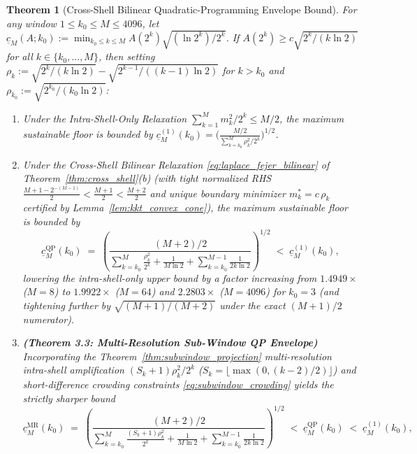 \documentclass[11pt,reqno]{amsart}
\newtheorem{theorem}{Theorem}[section]
\theoremstyle{definition}
\theoremstyle{remark}
\begin{document}
\begin{theorem}[Cross-Shell Bilinear Quadratic-Programming Envelope Bound]\label{thm:qp_envelope}
For any window $1 \le k_0 \le M \le 4096$, let $\underline{c}_M(A; k_0) := \min_{k_0 \le k \le M} A(2^k)\sqrt{(\ln 2^k)/2^k}$. If $A(2^k) \ge c \sqrt{2^k / (k \ln 2)}$ for all $k \in \{k_0, \dots, M\}$, then setting $\rho_k := \sqrt{2^k / (k \ln 2)} - \sqrt{2^{k-1} / ((k-1)\ln 2)}$ for $k > k_0$ and $\rho_{k_0} := \sqrt{2^{k_0}/(k_0 \ln 2)}$:
\begin{enumerate}
  \item[\textup{(i)}] Under the Intra-Shell-Only Relaxation $\sum_{k=1}^M m_k^2/2^k \le M/2$, the maximum sustainable floor is bounded by $\underline{c}_M^{(1)}(k_0) = \bigl(\frac{M/2}{\sum_{k=k_0}^M \rho_k^2 / 2^k}\bigr)^{1/2}$.
  \item[\textup{(ii)}] Under the Cross-Shell Bilinear Relaxation \eqref{eq:laplace_fejer_bilinear} of Theorem~\ref{thm:cross_shell}(b) (with tight normalized RHS $\frac{M + 1 - 2^{-(M-1)}}{2} < \frac{M + 1}{2} < \frac{M + 2}{2}$ and unique boundary minimizer $m_k^* = c\,\rho_k$ certified by Lemma~\ref{lem:kkt_convex_cone}), the maximum sustainable floor is bounded by
  \begin{equation}\label{eq:qp_envelope_bound}
    \underline{c}_M^{\mathrm{QP}}(k_0) \;=\; \left(\frac{(M + 2)/2}{\sum_{k=k_0}^M \frac{\rho_k^2}{2^k} + \frac{1}{M \ln 2} + \sum_{k=k_0}^{M-1} \frac{1}{2 k \ln 2}}\right)^{1/2} \;<\; \underline{c}_M^{(1)}(k_0),
  \end{equation}
  lowering the intra-shell-only upper bound by a factor increasing from $1.4949\times$ ($M = 8$) to $1.9922\times$ ($M = 64$) and $2.2803\times$ ($M = 4096$) for $k_0 = 3$ (and tightening further by $\sqrt{(M+1)/(M+2)}$ under the exact $(M+1)/2$ numerator).
  \item[\textup{(iii)}] \textbf{(Theorem 3.3: Multi-Resolution Sub-Window QP Envelope)} Incorporating the Theorem~\ref{thm:subwindow_projection} multi-resolution intra-shell amplification $(S_k + 1)\rho_k^2/2^k$ ($S_k = \lfloor \max(0, (k-2)/2)\rfloor$) and short-difference crowding constraints \eqref{eq:subwindow_crowding} yields the strictly sharper bound
  \begin{equation}\label{eq:mr_envelope_bound}
    \underline{c}_M^{\mathrm{MR}}(k_0) \;=\; \left(\frac{(M + 2)/2}{\sum_{k=k_0}^M \frac{(S_k + 1)\rho_k^2}{2^k} + \frac{1}{M \ln 2} + \sum_{k=k_0}^{M-1} \frac{1}{2 k \ln 2}}\right)^{1/2} \;<\; \underline{c}_M^{\mathrm{QP}}(k_0) \;<\; \underline{c}_M^{(1)}(k_0),
  \end{equation}

\end{enumerate}
\end{theorem}
\end{document}
